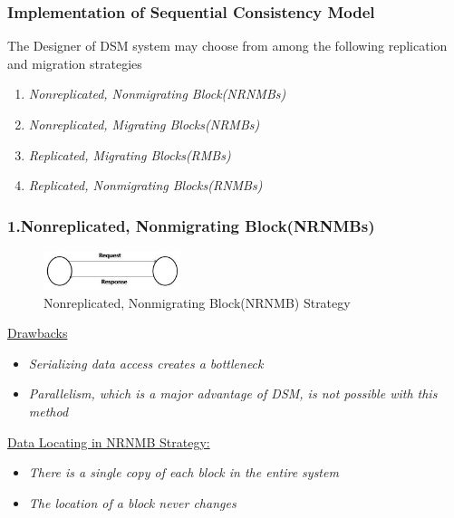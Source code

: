 \documentclass{beamer}
\begin{document}
\begin{frame}
	\frametitle{Implementation of Sequential Consistency Model}
	\vspace{0.5cm}
	The Designer of DSM system may choose from among the following replication and migration strategies
	\vspace{0.5cm}
	\begin{enumerate}
		\item \textit{Nonreplicated, Nonmigrating Block(NRNMBs)}
		\item \textit{Nonreplicated, Migrating Blocks(NRMBs)}
		\item \textit{Replicated, Migrating Blocks(RMBs)}
		\item \textit{Replicated, Nonmigrating Blocks(RNMBs)}
	\end{enumerate}
	\vspace{4cm}
\end{frame}


\begin{frame}
	\frametitle{1.Nonreplicated, Nonmigrating Block(NRNMBs)}
	\begin{figure}
		\centering
		\includegraphics[width=4cm]{fig53.jpg}
		\caption{Nonreplicated, Nonmigrating Block(NRNMB) Strategy}
		\label{fig53}
	\end{figure}
	\underline{Drawbacks}
	\vspace{0.25cm}
	\begin{itemize}
		\item \textit{Serializing data access creates a bottleneck}
		\item \textit{Parallelism, which is a major advantage of DSM, is not possible with this method}
	\end{itemize}
	\underline{Data Locating in NRNMB Strategy:}
	\vspace{0.25cm}
	\begin{itemize}
		\item \textit{There is a single copy of each block in the entire system}
		\item \textit{The location of a block never changes}
	\end{itemize}
\end{frame}
\end{document}
